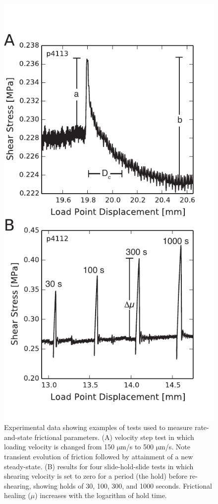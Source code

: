 \begin{figure}[t!]
\begin{centering}
\includegraphics{chap_granular_stiffness/Fig1.pdf}
\caption{\label{fig:tests}
Experimental data showing examples of tests used to measure rate-and-state frictional parameters. (A) velocity step test in which loading velocity is changed from 150 $\mathrm{\mu}$m/s to 500 $\mathrm{\mu}$m/s. Note transient evolution of friction followed by attainment of a new steady-state. (B) results for four slide-hold-slide tests in which shearing velocity is set to zero for a period (the hold) before re-shearing, showing holds of 30, 100, 300, and 1000 seconds. Frictional healing ({}$\mu$) increases with the logarithm of hold time.}
\end{centering}
\end{figure}

